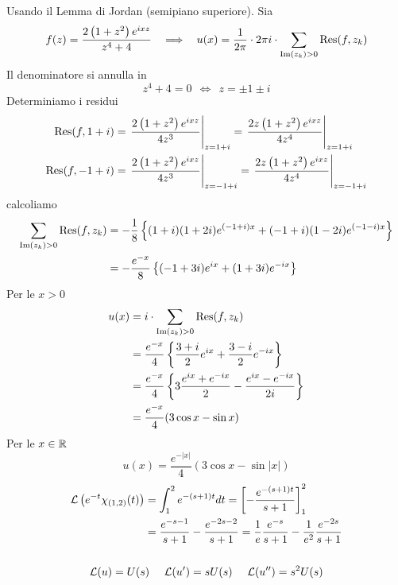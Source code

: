 Usando il Lemma di Jordan (semipiano superiore). Sia
\begin{equation*}
f(z) = \frac{2\left(1 + z^{2}\right) e^{ixz}}{z^{4} + 4} \ \ \implies \ \ u(x) = \frac{1}{2\pi } \cdot 2\pi i\cdot \sum _{\operatorname{Im} (z_{k})  > 0}\operatorname{Res} (f,z_{k})
\end{equation*}
Il denominatore si annulla in
\begin{equation*}
z^{4} + 4 = 0\ \ \iff \ \ z = \pm 1\pm i
\end{equation*}
Determiniamo i residui
\begin{align*}
\operatorname{Res} (f,1 + i) & = \left. \frac{2\left(1 + z^{2}\right) e^{ixz}}{4z^{3}}\right| _{z = 1 + i} = \left. \frac{2z\left(1 + z^{2}\right) e^{ixz}}{4z^{4}}\right| _{z = 1 + i}\\
\operatorname{Res} (f, - 1 + i) & = \left. \frac{2\left(1 + z^{2}\right) e^{ixz}}{4z^{3}}\right| _{z = -1 + i} = \left. \frac{2z\left(1 + z^{2}\right) e^{ixz}}{4z^{4}}\right| _{z = -1 + i}
\end{align*}
calcoliamo
\begin{align*}
\sum _{\operatorname{Im} (z_{k})  > 0}\operatorname{Res} (f,z_{k}) & = - \frac{1}{8}\left\{(1 + i)(1 + 2i) e^{(- 1 + i) x} + (- 1 + i)(1 - 2i) e^{(- 1 - i) x}\right\}\\
 & = - \frac{e^{ - x}}{8}\left\{(- 1 + 3i) e^{ix} + (1 + 3i) e^{ - ix}\right\}
\end{align*}
Per le $x > 0$
\begin{align*}
u(x) & = i\cdot \sum _{\operatorname{Im} (z_{k})  > 0}\operatorname{Res} (f,z_{k})\\
 & = \frac{e^{ - x}}{4}\left\{\frac{3 + i}{2} e^{ix} + \frac{3 - i}{2} e^{ - ix}\right\}\\
 & = \frac{e^{ - x}}{4}\left\{3\frac{e^{ix} + e^{ - ix}}{2} - \frac{e^{ix} - e^{ - ix}}{2i}\right\}\\
 & = \frac{e^{ - x}}{4}(3\cos x - \sin x)
\end{align*}
Per le $x\in \mathbb{R} $
\begin{equation*}
u(x) = \frac{e^{ - | x| }}{4}(3\cos x - \sin| x|)
\end{equation*}
\Soluzione
\begin{gather*}
\begin{aligned}
\mathcal{L}\left(e^{ - t} \chi _{(1,2)}(t)\right) & = \int ^{2}_{1} e^{ - (s + 1) t} dt = \left[ - \frac{e^{ - (s + 1) t}}{s + 1}\right]^{2}_{1}\\
 & = \frac{e^{ - s - 1}}{s + 1} - \frac{e^{ - 2s - 2}}{s + 1} = \frac{1}{e}\frac{e^{ - s}}{s + 1} - \frac{1}{e^{2}}\frac{e^{ - 2s}}{s + 1}
\end{aligned}\\
\\
\mathcal{L}(u) = U(s) \ \ \ \ \mathcal{L}(u') = sU(s) \ \ \ \ \mathcal{L}(u'') = s^{2} U(s)
\end{gather*}

